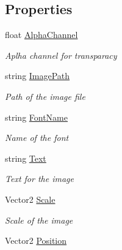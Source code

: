 \subsection*{Properties}
\begin{DoxyCompactItemize}
\item 
float \hyperlink{class_hel_project_1_1_u_i_1_1_image_a88c8f934be50346b0c1fcdb125c5f3ce}{Alpha\+Channel}
\begin{DoxyCompactList}\small\item\em Aplha channel for transparacy \end{DoxyCompactList}\item 
string \hyperlink{class_hel_project_1_1_u_i_1_1_image_a500e6631592affa3501b85c8399f4ee5}{Image\+Path}
\begin{DoxyCompactList}\small\item\em Path of the image file \end{DoxyCompactList}\item 
string \hyperlink{class_hel_project_1_1_u_i_1_1_image_ae5b5c6f2347963176eff641b8a725485}{Font\+Name}
\begin{DoxyCompactList}\small\item\em Name of the font \end{DoxyCompactList}\item 
string \hyperlink{class_hel_project_1_1_u_i_1_1_image_a5ee12296f31949495524fba982677dc4}{Text}
\begin{DoxyCompactList}\small\item\em Text for the image \end{DoxyCompactList}\item 
Vector2 \hyperlink{class_hel_project_1_1_u_i_1_1_image_aaee02769150fffb97a56c2883b679054}{Scale}
\begin{DoxyCompactList}\small\item\em Scale of the image \end{DoxyCompactList}\item 
Vector2 \hyperlink{class_hel_project_1_1_u_i_1_1_image_a5411311ded8aaad6a7701ebf85cf4195}{Position}

\end{DoxyCompactItemize}
